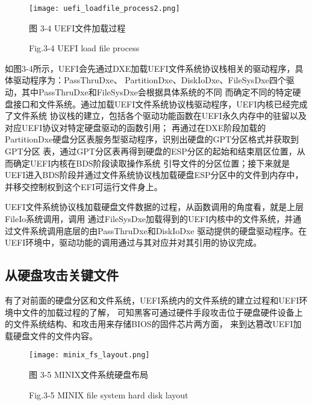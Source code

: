 \begin{figure}[htb]
    \vspace{0cm}   
    \setlength{\abovecaptionskip}{0.3cm}  
	\centering
    \texttt{[image: uefi\_loadfile\_process2.png]}
    \caption*{图 3-4 UEFI文件加载过程}
    \setlength{\belowcaptionskip}{-0.7cm}
    \caption*{Fig.3-4 UEFI load file process}
\end{figure}

如图3-4所示，UEFI会先通过DXE加载UEFI文件系统协议栈相关的驱动程序，具体驱动程序为：PassThruDxe、
PartitionDxe、DiskIoDxe、FileSysDxe四个驱动，其中PassThruDxe和FileSysDxe会根据具体系统的不同
而确定不同的特定硬盘接口和文件系统。通过加载UEFI文件系统协议栈驱动程序，UEFI内核已经完成了文件系统
协议栈的建立，包括各个驱动功能函数在UEFI永久内存中的驻留以及对应UEFI协议对特定硬盘驱动的函数引用；
再通过在DXE阶段加载的PartitionDxe硬盘分区表服务型驱动程序，识别出硬盘的GPT分区格式并获取到GPT分区
表，通过GPT分区表再得到硬盘的ESP分区的起始和结束扇区位置，从而确定UEFI内核在BDS阶段读取操作系统
引导文件的分区位置；接下来就是UEFI进入BDS阶段并通过文件系统协议栈加载硬盘ESP分区中的文件到内存中，
并移交控制权到这个EFI可运行文件身上。
\par UEFI文件系统协议栈加载硬盘文件数据的过程，从函数调用的角度看，就是上层FileIo系统调用，调用
通过FileSysDxe加载得到的UEFI内核中的文件系统，并通过文件系统调用底层的由PassThruDxe和DiskIoDxe
驱动提供的硬盘驱动程序。在UEFI环境中，驱动功能的调用通过与其对应并对其引用的协议完成。

\subsection{从硬盘攻击关键文件}
有了对前面的硬盘分区和文件系统，UEFI系统内的文件系统的建立过程和UEFI环境中文件的加载过程的了解，
可知黑客可通过硬件手段攻击位于硬盘硬件设备上的文件系统结构\cite{chinese33}、和攻击用来存储BIOS的固件芯片两方面，
来到达篡改UEFI加载硬盘文件的文件内容。

\begin{figure}[htb]
    \vspace{0cm}   
    \setlength{\abovecaptionskip}{0.3cm}  
	\centering
    \texttt{[image: minix\_fs\_layout.png]}
    \caption*{图 3-5 MINIX文件系统硬盘布局}
    \setlength{\belowcaptionskip}{-0.7cm}
    \caption*{Fig.3-5 MINIX file system hard disk layout}
\end{figure}

